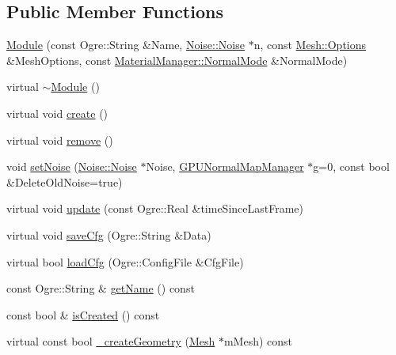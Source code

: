\subsection*{Public Member Functions}
\begin{CompactItemize}
\item 
\hyperlink{class_hydrax_1_1_module_1_1_module_b82e857eb19eac9c9091097909f3d566}{Module} (const Ogre::String \&Name, \hyperlink{class_hydrax_1_1_noise_1_1_noise}{Noise::Noise} $\ast$n, const \hyperlink{struct_hydrax_1_1_mesh_1_1_options}{Mesh::Options} \&MeshOptions, const \hyperlink{class_hydrax_1_1_material_manager_aa14689cd1c259f48954dfecda9b296f}{MaterialManager::NormalMode} \&NormalMode)
\item 
virtual \hyperlink{class_hydrax_1_1_module_1_1_module_0490f405b7150266765fb44ad1aefa8c}{$\sim$Module} ()
\item 
virtual void \hyperlink{class_hydrax_1_1_module_1_1_module_4b696328c3fc1496f757e929f44f3258}{create} ()
\item 
virtual void \hyperlink{class_hydrax_1_1_module_1_1_module_21f60a53a99d72ff00d3fe5565518165}{remove} ()
\item 
void \hyperlink{class_hydrax_1_1_module_1_1_module_f591ded25b7cbba848ec2853402fa91e}{setNoise} (\hyperlink{class_hydrax_1_1_noise_1_1_noise}{Noise::Noise} $\ast$Noise, \hyperlink{class_hydrax_1_1_g_p_u_normal_map_manager}{GPUNormalMapManager} $\ast$g=0, const bool \&DeleteOldNoise=true)
\item 
virtual void \hyperlink{class_hydrax_1_1_module_1_1_module_2042d450f99d9348fa4b7bd29ba89df3}{update} (const Ogre::Real \&timeSinceLastFrame)
\item 
virtual void \hyperlink{class_hydrax_1_1_module_1_1_module_998a5baf42f57b02ca7bc20bc12f95a9}{saveCfg} (Ogre::String \&Data)
\item 
virtual bool \hyperlink{class_hydrax_1_1_module_1_1_module_bedb96357608c0744bb7816ae1c2b0bb}{loadCfg} (Ogre::ConfigFile \&CfgFile)
\item 
const Ogre::String \& \hyperlink{class_hydrax_1_1_module_1_1_module_f00dbb4fcb83e45e89c7d537860ee486}{getName} () const 
\item 
const bool \& \hyperlink{class_hydrax_1_1_module_1_1_module_66097127eb529786f7384b4d39d9e43e}{isCreated} () const 
\item 
virtual const bool \hyperlink{class_hydrax_1_1_module_1_1_module_e58d6103f780287cb00a8c4647db667e}{\_\-createGeometry} (\hyperlink{class_hydrax_1_1_mesh}{Mesh} $\ast$mMesh) const 
\item 

\end{CompactItemize}
